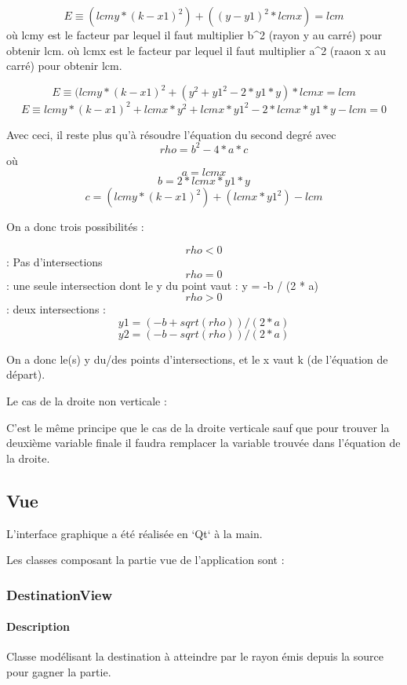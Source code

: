 \documentclass[]{article}
\begin{document}
$$E \equiv (lcmy * (k - x1)^2) + ((y - y1)^2 * lcmx) = lcm$$  
    où lcmy est le facteur par lequel il faut multiplier
    b^2 (rayon y au carré) pour obtenir lcm.
    où lcmx est le facteur par lequel il faut multiplier
    a^2 (raaon x au carré) pour obtenir lcm.

$$E \equiv (lcmy * (k-x1)^2 + (y^2 + y1^2 - 2*y1*y) * lcmx = lcm$$
$$E \equiv lcmy * (k-x1)^2 + lcmx*y^2 + lcmx * y1^2 - 2*lcmx*y1*y - lcm = 0$$

Avec ceci, il reste plus qu'à résoudre l'équation du second degré 
avec $$rho = b^2 - 4*a*c$$
    où $$a = lcmx$$
      $$b = 2*lcmx*y1*y$$
      $$c = (lcmy * (k-x1)^2) + (lcmx * y1^2) - lcm$$


On a donc trois possibilités : 

    $$rho < 0$$ : Pas d'intersections
    $$rho = 0$$ : une seule intersection dont le y du point vaut : 
        y = -b / (2 * a)
    $$rho > 0$$ : deux intersections : 
        $$y1 = (-b + sqrt(rho)) / (2 * a)$$
        $$y2 = (-b - sqrt(rho)) / (2 * a)$$

    On a donc le(s) y du/des points d'intersections, et le x
    vaut k (de l'équation de départ).



Le cas de la droite non verticale : 


C'est le même principe que le cas de la droite verticale sauf
que pour trouver la deuxième variable finale il faudra
remplacer la variable trouvée dans l'équation de la droite.

\subsection{Vue}


L’interface graphique a été réalisée en `Qt` à la main.

Les classes composant la partie vue de l’application sont :

\subsubsection{DestinationView}

\paragraph{Description}


Classe modélisant la destination à atteindre par le rayon émis depuis la source pour gagner la partie.
\end{document}
